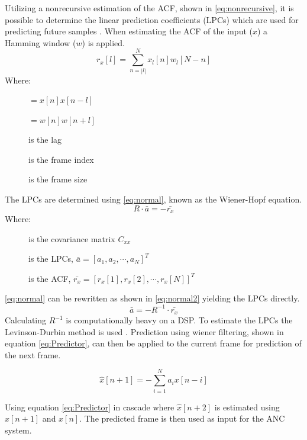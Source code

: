 Utilizing a nonrecursive estimation of the ACF, shown in \autoref{eq:nonrecursive}, it is possible to determine the linear prediction coefficients (LPCs) which are used for predicting future samples \cite{LinearPrediction}. When estimating the ACF of the input ($x$) a Hamming window ($w$) is applied.
\begin{equation}\label{eq:nonrecursive}
r_x[l] = \sum^{N}_{n=\left| l\right|} x_l[n]w_l[N-n]
\end{equation}
Where:
\vspace{-8mm}
\begin{description}
	\item[] $=x[n]x[n-l]$ 
	\item[] $=w[n]w[n+l]$
	\item[] is the lag 
	\item[] is the frame index
	\item[] is the frame size
\end{description}
The LPCs are determined using \autoref{eq:normal}, known as the Wiener-Hopf equation.
\begin{equation}\label{eq:normal}
R \cdot \bar{a} = -\bar{r_x}
\end{equation}
Where:
\vspace{-8mm} %
\begin{description}
	\item[] is the covariance matrix $C_{xx}$
	\item[] is the LPCs, $\bar{a} = [a_1 , a_2, \cdots, a_N]^T$
	\item[] is the ACF, $\bar{r_x} = [r_x[1] , r_x[2], \cdots, r_x[N]]^T$
\end{description}
\autoref{eq:normal} can be rewritten as shown in \autoref{eq:normal2} yielding the LPCs directly.  
 \begin{equation}\label{eq:normal2}
\bar{a} = -R^{-1}\cdot \bar{r_x}
\end{equation}
Calculating $R^{-1}$ is computationally heavy on a DSP. To estimate the LPCs the Levinson-Durbin method is used \cite{LinearPrediction}. Prediction using wiener filtering, shown in equation \ref{eq:Predictor}, can then be applied to the current frame for prediction of the next frame. 

\begin{equation}\label{eq:Predictor}
\hat{x}[n+1] =- \sum^{N}_{i=1}a_ix[n-i]
\end{equation}

Using equation \ref{eq:Predictor} in cascade where $\hat{x}[n+2]$ is estimated using $\hat{x}[n+1]$ and $x[n]$. The predicted frame is then used as input for the ANC system.

